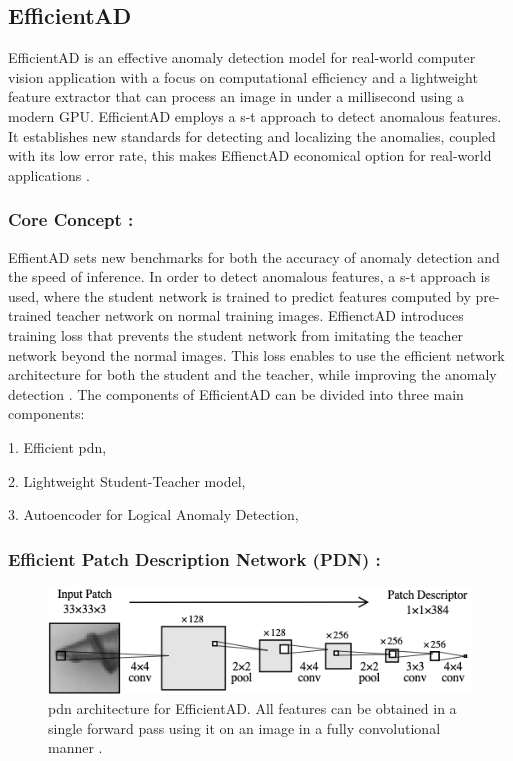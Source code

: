 \subsection{EfficientAD}
\label{subsec:efficientad}

EfficientAD is an effective anomaly detection model for real-world computer vision application with a focus on computational efficiency and a lightweight feature extractor that can process an image in under a millisecond using a modern GPU. EfficientAD employs a \gls{s-t} approach to detect anomalous features. It establishes new standards for detecting and localizing the anomalies, coupled with its low error rate, this makes EffienctAD economical option for real-world applications \cite{batzner2024efficientadaccuratevisualanomaly}.

\subsubsection*{Core Concept :}

EffientAD sets new benchmarks for both the accuracy of anomaly detection and the speed of inference. In order to detect anomalous features, a \gls{s-t} approach is used, where the student network is trained to predict features computed by pre-trained teacher network on normal training images. EffienctAD introduces training loss that prevents the student network from imitating the teacher network beyond the normal images. This loss enables to use the efficient network architecture for both the student and the teacher, while improving the anomaly detection \cite{batzner2024efficientadaccuratevisualanomaly}. The components of EfficientAD can be divided into three main components:

1. Efficient \gls{pdn},

2. Lightweight Student-Teacher model,

3. Autoencoder for Logical Anomaly Detection,

\subsubsection*{Efficient Patch Description Network (PDN) :}

\begin{figure}[ht!]
    \centering
    \includegraphics[width=1.1\linewidth]{Rohit_Master_Thesis//Images/pdn.png}
    \caption{\gls{pdn} architecture for EfficientAD. All features can be obtained in a single forward pass using it on an image in a fully convolutional manner \cite{batzner2024efficientadaccuratevisualanomaly}.}
    \label{fig:pdn architecture}
\end{figure}

